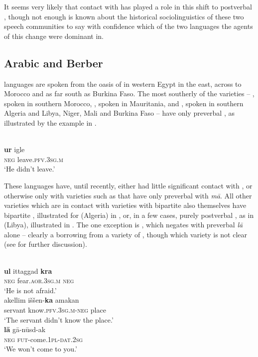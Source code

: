 \documentclass[output=paper]{langsci/langscibook}
\begin{document}
It seems very likely that contact with   has played a role in this shift to postverbal , though not enough is known about the historical sociolinguistics of these two speech communities to say with confidence which of the two languages the agents of this change were dominant in.



\subsection{Arabic and Berber}


 languages are spoken from the oasis of  in western Egypt in the east, across to Morocco and as far south as Burkina Faso. The most southerly of the  varieties – , spoken in southern Morocco, , spoken in Mauritania, and , spoken in southern Algeria and Libya, Niger, {Mali} and Burkina Faso – have only preverbal , as illustrated by the  example in .


\ea\label{tua}
{        \citep[10]{Chaker1996}}\\
\gll \textbf{ur} igle\\
     \textsc{neg} leave\textsc{.pfv.3sg.m}\\
\glt ‘He didn’t leave.’
\z

These languages have, until recently, either had little significant contact with , or otherwise only with varieties such as  that have only preverbal  with \textit{mā}. All other  varieties which are in contact with  varieties with bipartite  also themselves have bipartite , illustrated for  (Algeria) in , or, in a few cases, purely postverbal , as in  (Libya), illustrated in . The one exception is , which negates with preverbal \textit{lā} alone – clearly a borrowing from a variety of , though which variety is not clear (see \citealt{Souag2009} for further discussion).

\ea\label{kab}
{        \citep[25]{Rabhi1996}}\\
\gll \textbf{ul} ittaggad \textbf{kra}\\
     \textsc{neg} fear.\textsc{aor.3sg.m} \textsc{neg}\\
\glt ‘He is not afraid.’
\ex \label{awjneg}
{        \citep[82]{Paradisi1961}}\\
\gll akellim iššen-\textbf{ka} amakan \\
     servant know\textsc{.pfv.3sg.m-neg} place\\
\glt ‘The servant didn’t know the place.’
\ex
{        \citep[58]{Souag2009}}\\
\gll \textbf{lā} gā-nūsd-ak\\
     \textsc{neg} \textsc{fut-}come\textsc{.1pl-dat.2sg}\\
\glt ‘We won’t come to you.’
\z
\end{document}
